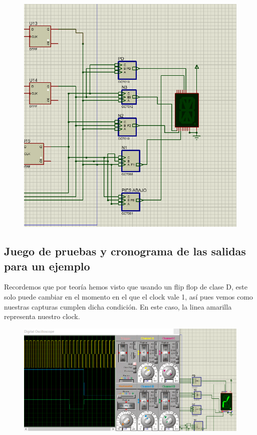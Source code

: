 \documentclass{article}
\begin{document}
\begin{figure}[!h]
    \centering
    \includegraphics[scale=0.5]{COMMENT2.PNG}
\end{figure}
\newpage
\subsection{Juego de pruebas y cronograma de las salidas para un ejemplo}
Recordemos que por teoría hemos visto que usando un flip flop de clase D, este solo puede cambiar en el momento en el que el clock vale 1, así pues vemos como nuestras capturas cumplen dicha condición. En este caso, la linea amarilla representa nuestro clock.

\begin{figure}[!h]
    \centering
    \includegraphics[scale=0.5]{1.PNG}
\end{figure} 
\end{document}
